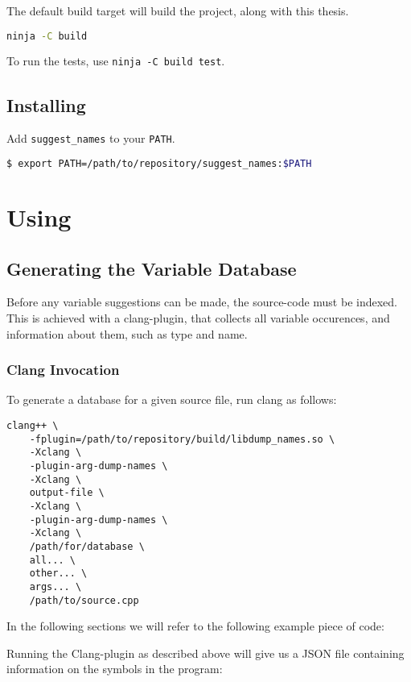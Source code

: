 The default build target will build the project, along with this thesis.
\begin{lstlisting}[language=bash]
ninja -C build
\end{lstlisting}

To run the tests, use \lstinline|ninja -C build test|.

\subsection{Installing}
Add \lstinline|suggest_names| to your \lstinline|PATH|.
\begin{lstlisting}[language=bash]
$ export PATH=/path/to/repository/suggest_names:$PATH
\end{lstlisting}


\section{Using}
\subsection{Generating the Variable Database}
Before any variable suggestions can be made, the source-code must be indexed.
This is achieved with a clang-plugin, that collects all variable occurences,
and information about them, such as type and name.

\subsubsection{Clang Invocation}
To generate a database for a given source file, run clang as follows:

\begin{lstlisting}[caption={Invocation of Clang}]
clang++ \
	-fplugin=/path/to/repository/build/libdump_names.so \
	-Xclang \
	-plugin-arg-dump-names \
	-Xclang \
	output-file \
	-Xclang \
	-plugin-arg-dump-names \
	-Xclang \
	/path/for/database \
	all... \
	other... \
	args... \
	/path/to/source.cpp
\end{lstlisting}

In the following sections we will refer to the following example piece of \CC{}
code:



Running the Clang-plugin as described above will give us a JSON file containing
information on the symbols in the program:

